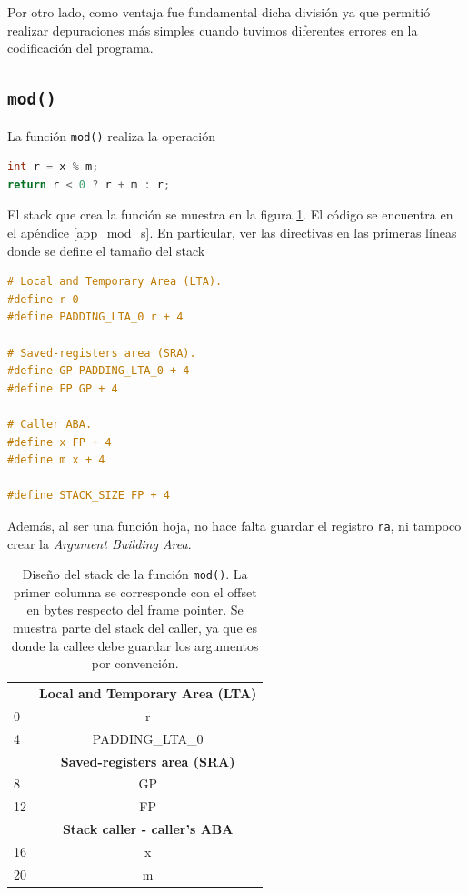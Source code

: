 \documentclass[a4paper,12pt]{article}
\numberwithin{equation}{section}
\numberwithin{figure}{section}
\begin{document}
Por otro lado, como ventaja fue fundamental dicha división ya que permitió realizar depuraciones más simples cuando tuvimos diferentes errores en la codificación del programa.

\subsection{\texttt{mod()}}

La función \texttt{mod()} realiza la operación
\begin{lstlisting}[language=C, style=StyleC]
int r = x % m;
return r < 0 ? r + m : r;
\end{lstlisting}

El stack que crea la función se muestra en la figura \ref{stack_mod}. El código se encuentra en el apéndice \ref{app_mod_s}. En particular, ver las directivas en las primeras líneas donde se define el tamaño del stack
\begin{lstlisting}[language=C, style=StyleC]
# Local and Temporary Area (LTA).
#define r 0
#define PADDING_LTA_0 r + 4

# Saved-registers area (SRA).
#define GP PADDING_LTA_0 + 4
#define FP GP + 4

# Caller ABA.
#define x FP + 4
#define m x + 4

#define STACK_SIZE FP + 4
\end{lstlisting}

Además, al ser una función hoja, no hace falta guardar el registro \texttt{ra}, ni tampoco crear la \textit{Argument Building Area}.

\begin{table}[H]
	\centering
	\begin{tabular}{@{}l|c|@{}}
		\cmidrule(l){2-2} 
		\multicolumn{1}{c|}{\textbf{}} & \textbf{Local and Temporary Area (LTA)} \\ \cmidrule(l){2-2} 
		0 & r \\ \cmidrule(l){2-2} 
		4 & PADDING\_LTA\_0 \\ \cmidrule(l){2-2} 
		\multicolumn{1}{c|}{\textbf{}} & \textbf{Saved-registers area (SRA)} \\ \cmidrule(l){2-2} 
		8 & GP \\ \cmidrule(l){2-2} 
		12 & FP \\ \cmidrule(l){2-2} 
		\multicolumn{1}{c|}{\textbf{}} & \textbf{Stack caller - caller's ABA} \\ \cmidrule(l){2-2} 
		16 & x \\ \cmidrule(l){2-2} 
		20 & m \\ \cmidrule(l){2-2} 
	\end{tabular}
	\caption{Diseño del stack de la función \texttt{mod()}. La primer columna se corresponde con el offset en bytes respecto del frame pointer. Se muestra parte del stack del caller, ya que es donde la callee debe guardar los argumentos por convención.}
	\label{stack_mod}
\end{table}
\end{document}
